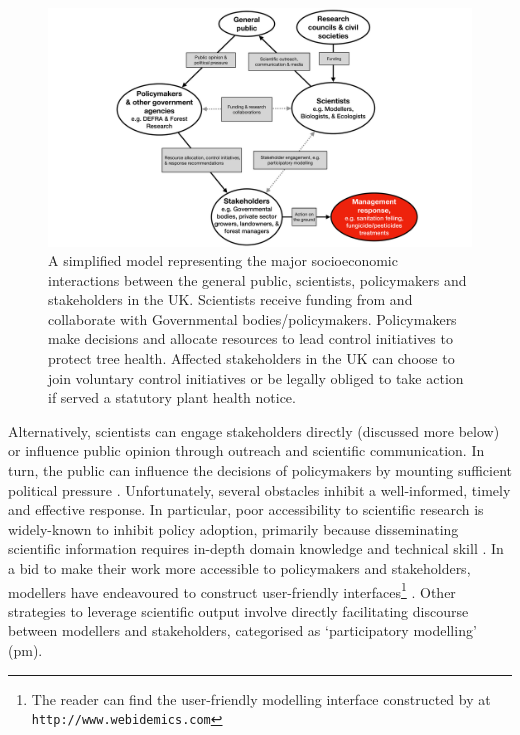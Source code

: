 \begin{figure}
    \centering
    \includegraphics[scale=0.35]{chapter1/figures/modelling-and-policy.pdf}
    \caption{A simplified model representing the major socioeconomic interactions between the general public, scientists, policymakers and stakeholders in the UK. Scientists receive funding from and collaborate with Governmental bodies/policymakers. Policymakers make decisions and allocate resources to lead control initiatives to protect tree health. Affected stakeholders in the UK can choose to join voluntary control initiatives or be legally obliged to take action if served a statutory plant health notice. }
    \label{fig:modelling-and-policies}
\end{figure}

Alternatively, scientists can engage stakeholders directly (discussed more below) or influence public opinion through outreach and
scientific communication. In turn, the public can influence the decisions of policymakers by
mounting sufficient political pressure \cite{fuller2016public}.
Unfortunately, several obstacles inhibit a well-informed, timely and effective response. 
In particular, poor accessibility to scientific research is widely-known to inhibit policy adoption, 
primarily because disseminating scientific information requires in-depth domain knowledge and technical skill \cite{jones2020modelling}.
In a bid to make their work more accessible to policymakers and stakeholders, modellers have endeavoured to construct user-friendly interfaces\footnote{
The reader can find the user-friendly modelling interface constructed by \cite{WEBIDEMICS} at \nolinkurl{http://www.webidemics.com}} \cite{WEBIDEMICS}.
Other strategies to leverage scientific output involve directly facilitating discourse between modellers and stakeholders, categorised as `participatory modelling' (\acrshort{pm}).

